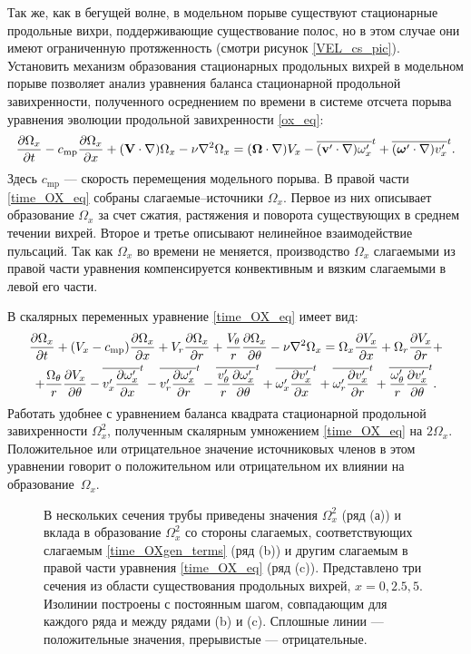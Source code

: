 Так же, как в бегущей волне, в модельном порыве существуют стационарные продольные  вихри, поддерживающие существование полос, но в этом случае они имеют ограниченную протяженность (смотри рисунок \ref{VEL_cs_pic}). Установить механизм образования стационарных продольных вихрей в модельном порыве позволяет анализ уравнения баланса стационарной продольной завихренности, полученного осреднением по времени в системе отсчета порыва уравнения эволюции продольной завихренности \eqref{ox_eq}: 
\begin{equation} \label{time_OX_eq}
\frac{\partial \Omega_x}{\partial t} - c_\mathrm{mp} \frac{\partial \Omega_x}{\partial x} + (\mathbf{V} \cdot \nabla) \Omega_x - \nu\nabla^2 \Omega_x = (\mbox{\boldmath$\Omega$} \cdot \nabla) V_x - \overline{(\mathbf{v}' \cdot \nabla) \omega'_x}^t + \overline{(\mbox{\boldmath$\omega$}' \cdot \nabla) v'_x}^t.
\end{equation}
Здесь $c_\mathrm{mp}$ --- скорость перемещения модельного порыва. В правой части \eqref{time_OX_eq} собраны слагаемые--источники $\Omega_x$. Первое из них описывает образование $\Omega_x$ за счет сжатия, растяжения и поворота существующих в среднем течении вихрей. Второе и третье описывают нелинейное взаимодействие пульсаций. Так как $\Omega_x$ во времени не меняется, производство $\Omega_x$ слагаемыми из правой части уравнения компенсируется конвективным и вязким слагаемыми в левой его части. 

В скалярных переменных уравнение \eqref{time_OX_eq} имеет вид:
\begin{multline}\label{time_OX1_eq}
\frac{\partial \Omega_x}{\partial t} + (V_x - c_\mathrm{mp})\frac{\partial \Omega_x}{\partial x} + V_r \frac{\partial \Omega_x}{\partial r} + \frac{V_\theta}{r} \frac{\partial \Omega_x}{\partial \theta} - \nu\nabla^2\Omega_x= \Omega_x \frac{\partial V_x}{\partial x} + \Omega_r \frac{\partial V_x}{\partial r} + \\ + \frac{\Omega_\theta}{r} \frac{\partial V_x}{\partial \theta}
 - \overline{v'_x \frac{\partial \omega'_x}{\partial x}}^t - \overline{v'_r \frac{\partial \omega'_x}{\partial r}}^t - \overline{\frac{v'_\theta}{r} \frac{\partial \omega'_x}{\partial \theta}}^t
 + \overline{\omega'_x \frac{\partial v'_x}{\partial x}}^t + \overline{\omega'_r \frac{\partial v'_x}{\partial r}}^t + \overline{\frac{\omega'_\theta}{r} \frac{\partial v'_x}{\partial \theta}}^t.
\end{multline}
Работать удобнее с уравнением баланса квадрата стационарной продольной завихренности $\Omega_x^2$, полученным скалярным умножением \eqref{time_OX_eq} на $2\Omega_x$. Положительное или отрицательное значение источниковых членов в этом уравнении говорит о положительном или отрицательном их влиянии на образование~$\Omega_x$. 


\begin{figure}[h]
\caption{В нескольких сечения трубы приведены значения $\Omega_x^2$ (ряд (а)) и вклада в образование $\Omega_x^2$ со стороны слагаемых, соответствующих слагаемым \eqref{time_OXgen_terms} (ряд (b)) и другим слагаемым в правой части уравнения \eqref{time_OX_eq} (ряд (c)). Представлено три сечения из области существования продольных вихрей, $x=0,2.5,5$. Изолинии построены с постоянным шагом, совпадающим для каждого ряда и между рядами (b) и (c). Сплошные линии --- положительные значения, прерывистые --- отрицательные.}
\label{mp_OXgen_pic}
\end{figure}

